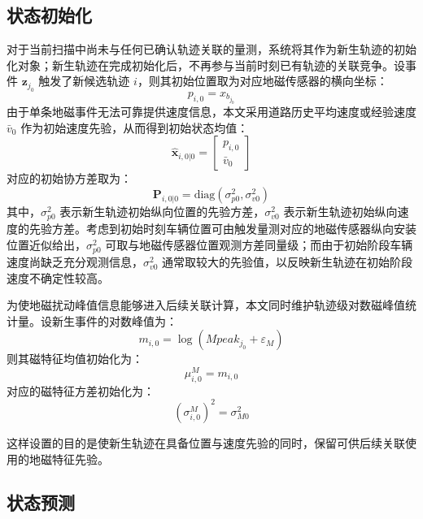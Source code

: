 \documentclass{xdupgthesis}
\begin{document}
\subsection{状态初始化}

对于当前扫描中尚未与任何已确认轨迹关联的量测，系统将其作为新生轨迹的初始化对象；新生轨迹在完成初始化后，不再参与当前时刻已有轨迹的关联竞争。设事件 $\mathbf z_{j_0}$ 触发了新候选轨迹 $i$，则其初始位置取为对应地磁传感器的横向坐标：
\begin{equation}
	p_{i,0}=x_{b_{j_0}}
	\label{eq:ch3_init_pos}
\end{equation}
由于单条地磁事件无法可靠提供速度信息，本文采用道路历史平均速度或经验速度 $\bar v_0$ 作为初始速度先验，从而得到初始状态均值：
\begin{equation}
	\hat{\mathbf x}_{i,0|0}=
	\begin{bmatrix}
		p_{i,0}\\
		\bar v_0
	\end{bmatrix}
	\label{eq:ch3_init_state}
\end{equation}
对应的初始协方差取为：
\begin{equation}
	\mathbf P_{i,0|0}=\mathrm{diag}\left(\sigma_{p0}^{2},\sigma_{v0}^{2}\right)
	\label{eq:ch3_init_cov}
\end{equation}
其中，$\sigma_{p0}^{2}$ 表示新生轨迹初始纵向位置的先验方差，$\sigma_{v0}^{2}$ 表示新生轨迹初始纵向速度的先验方差。考虑到初始时刻车辆位置可由触发量测对应的地磁传感器纵向安装位置近似给出，$\sigma_{p0}^{2}$ 可取与地磁传感器位置观测方差同量级；而由于初始阶段车辆速度尚缺乏充分观测信息，$\sigma_{v0}^{2}$ 通常取较大的先验值，以反映新生轨迹在初始阶段速度不确定性较高。

为使地磁扰动峰值信息能够进入后续关联计算，本文同时维护轨迹级对数磁峰值统计量。设新生事件的对数峰值为：
\begin{equation}
	m_{i,0}=\log(Mpeak_{j_0}+\varepsilon_M)
	\label{eq:ch3_init_mag}
\end{equation}
则其磁特征均值初始化为：
\begin{equation}
	\mu_{i,0}^{M}=m_{i,0}
	\label{eq:ch3_init_mag_mean}
\end{equation}
对应的磁特征方差初始化为：
\begin{equation}
	(\sigma_{i,0}^{M})^{2}=\sigma_{M0}^{2}
	\label{eq:ch3_init_mag_var}
\end{equation}

这样设置的目的是使新生轨迹在具备位置与速度先验的同时，保留可供后续关联使用的地磁特征先验。

\subsection{状态预测}
\end{document}
